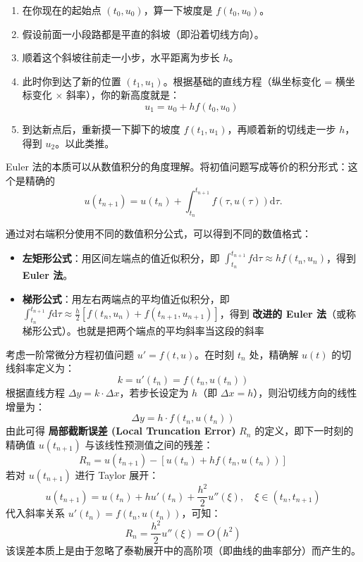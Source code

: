 \begin{enumerate}
    \item 在你现在的起始点 $(t_0, u_0)$，算一下坡度是 $f(t_0, u_0)$。
    \item 假设前面一小段路都是平直的斜坡（即沿着切线方向）。
    \item 顺着这个斜坡往前走一小步，水平距离为步长 $h$。
    \item 此时你到达了新的位置 $(t_1, u_1)$。根据基础的直线方程（纵坐标变化 = 横坐标变化 $\times$ 斜率），你的新高度就是：
    \begin{equation*}
        u_1 = u_0 + h f(t_0, u_0)
    \end{equation*}
    \item 到达新点后，重新摸一下脚下的坡度 $f(t_1, u_1)$，再顺着新的切线走一步 $h$，得到 $u_2$。以此类推。
\end{enumerate}
\begin{note}
Euler 法的本质可以从数值积分的角度理解。将初值问题写成等价的积分形式：这个是精确的
\begin{equation}
    u(t_{n+1}) = u(t_n) + \int_{t_n}^{t_{n+1}} f(\tau, u(\tau)) \mathrm{d}\tau.
\end{equation}

通过对右端积分使用不同的数值积分公式，可以得到不同的数值格式：
\begin{itemize}
    \item \textbf{左矩形公式}：用区间左端点的值近似积分，即 $\int_{t_n}^{t_{n+1}} f \mathrm{d}\tau \approx h f(t_n, u_n)$，得到 \textbf{Euler 法}。
    \item \textbf{梯形公式}：用左右两端点的平均值近似积分，即 $\int_{t_n}^{t_{n+1}} f \mathrm{d}\tau \approx \frac{h}{2}[f(t_n, u_n) + f(t_{n+1}, u_{n+1})]$，得到 \textbf{改进的 Euler 法}（或称梯形公式）。也就是把两个端点的平均斜率当这段的斜率
\end{itemize}
\end{note}
\begin{definition}[基于线性近似的局部截断误差]
考虑一阶常微分方程初值问题 $u' = f(t, u)$。在时刻 $t_n$ 处，精确解 $u(t)$ 的切线斜率定义为：
\[ k = u'(t_n) = f(t_n, u(t_n)) \]
根据直线方程 $\Delta y = k \cdot \Delta x$，若步长设定为 $h$（即 $\Delta x = h$），则沿切线方向的线性增量为：
\[ \Delta y = h \cdot f(t_n, u(t_n)) \]
由此可得 \textbf{局部截断误差 (Local Truncation Error)} $R_n$ 的定义，即下一时刻的精确值 $u(t_{n+1})$ 与该线性预测值之间的残差：
\[ R_n = u(t_{n+1}) - [u(t_n) + h f(t_n, u(t_n))] \]
若对 $u(t_{n+1})$ 进行 Taylor 展开：
\[ u(t_{n+1}) = u(t_n) + h u'(t_n) + \frac{h^2}{2}u''(\xi), \quad \xi \in (t_n, t_{n+1}) \]
代入斜率关系 $u'(t_n) = f(t_n, u(t_n))$，可知：
\[ R_n = \frac{h^2}{2}u''(\xi) = O(h^2) \]
该误差本质上是由于忽略了泰勒展开中的高阶项（即曲线的曲率部分）而产生的。
\end{definition}

